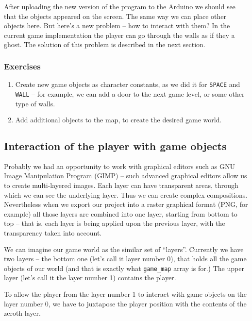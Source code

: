 \documentclass[../sparc.tex]{subfiles}
\begin{document}
After uploading the new version of the program to the Arduino we should see that
the objects appeared on the screen.  The same way we can place other objects
here.  But here's a new problem -- how to interact with them?  In the current
game implementation the player can go through the walls as if they a ghost.  The
solution of this problem is described in the next section.

\subsubsection{Exercises}
\begin{enumerate}
\item Create new game objects as character constants, as we did it for
  \texttt{SPACE} and \texttt{WALL} -- for example, we can add a
  door to the next game level, or some other type of walls.
\item Add additional objects to the map, to create the desired game world.
\end{enumerate}

\subsection{Interaction of the player with game objects}

Probably we had an opportunity to work with graphical editors such as GNU Image
Manipulation Program (GIMP) -- such advanced graphical editors allow us to create
multi-layered images.  Each layer can have transparent areas, through which we
can see the underlying layer.  Thus we can create complex compositions.
Nevertheless when we export our project into a raster graphical format (PNG, for
example) all those layers are combined into one layer, starting from bottom to
top -- that is, each layer is being applied upon the previous layer, with the
transparency taken into account.

We can imagine our game world as the similar set of ``layers''.  Currently we
have two layers -- the bottom one (let's call it layer number 0), that holds all
the game objects of our world (and that is exactly what
\texttt{game_map} array is for.)  The upper layer (let's call it the
layer number 1) contains the player.

To allow the player from the layer number 1 to interact with game objects on the
layer number 0, we have to juxtapose the player position with the contents of
the zeroth layer.
\end{document}
